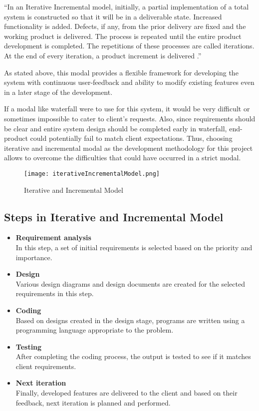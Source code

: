 \documentclass[12pt]{report}
\begin{document}
``In an Iterative Incremental model, initially, a partial implementation of a total system is constructed so that it will be in a deliverable state. Increased functionality is added. Defects, if any, from the prior delivery are fixed and the working product is delivered. The process is repeated until the entire product development is completed. The repetitions of these processes are called iterations. At the end of every iteration, a product increment is delivered \cite{tpoint_2019_iterative_incremental}.''

As stated above, this modal provides a flexible framework for developing the system with continuous user-feedback and ability to modify existing features even in a later stage of the development.

If a modal like waterfall were to use for this system, it would be very difficult or sometimes impossible to cater to client's requests. Also, since requirements should be clear and entire system design should be completed early in waterfall, end-product could potentially fail to match client expectations. Thus, choosing iterative and incremental modal as the development methodology for this project allows to overcome the difficulties that could have occurred in a strict modal.

\begin{figure}[H]
	\centering
	\texttt{[image: iterativeIncrementalModel.png]}
	\caption{Iterative and Incremental Model}
\end{figure}

\subsection{Steps in Iterative and Incremental Model}
\begin{itemize}
	\item {\bf{Requirement analysis}}\\
	      In this step, a set of initial requirements is selected based on the priority and importance.

	\item {\bf{Design}}\\
	      Various design diagrams and design documents are created for the selected requirements in this step.

	\item {\bf{Coding}}\\
	      Based on designs created in the design stage, programs are written using a programming language appropriate to the problem.

	\item {\bf{Testing}}\\
	      After completing the coding process, the output is tested to see if it matches client requirements.

	\item {\bf{Next iteration}}\\
	      Finally, developed features are delivered to the client and based on their feedback, next iteration is planned and performed.

\end{itemize}
\end{document}
